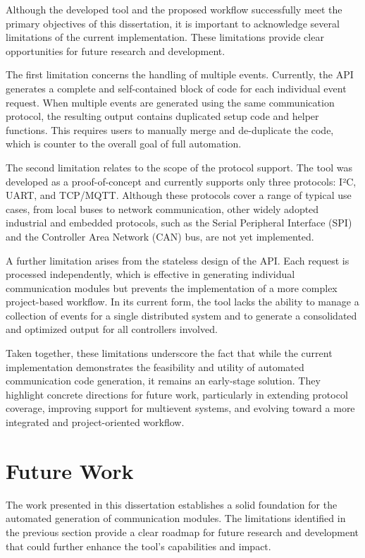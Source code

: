 Although the developed tool and the proposed workflow successfully meet the primary objectives of this dissertation, it is important to acknowledge several limitations of the current implementation. These limitations provide clear opportunities for future research and development. 

The first limitation concerns the handling of multiple events. Currently, the API generates a complete and self-contained block of code for each individual event request. When multiple events are generated using the same communication protocol, the resulting output contains duplicated setup code and helper functions. This requires users to manually merge and de-duplicate the code, which is counter to the overall goal of full automation.

The second limitation relates to the scope of the protocol support. The tool was developed as a proof-of-concept and currently supports only three protocols: I²C, UART, and TCP/MQTT. Although these protocols cover a range of typical use cases, from local buses to network communication, other widely adopted industrial and embedded protocols, such as the Serial Peripheral Interface (SPI) and the Controller Area Network (CAN) bus, are not yet implemented.

A further limitation arises from the stateless design of the API. Each request is processed independently, which is effective in generating individual communication modules but prevents the implementation of a more complex project-based workflow. In its current form, the tool lacks the ability to manage a collection of events for a single distributed system and to generate a consolidated and optimized output for all controllers involved.

Taken together, these limitations underscore the fact that while the current implementation demonstrates the feasibility and utility of automated communication code generation, it remains an early-stage solution. They highlight concrete directions for future work, particularly in extending protocol coverage, improving support for multievent systems, and evolving toward a more integrated and project-oriented workflow.



\section{Future Work}
\label{sec:future_work}

The work presented in this dissertation establishes a solid foundation for the automated generation of communication modules. The limitations identified in the previous section provide a clear roadmap for future research and development that could further enhance the tool's capabilities and impact. 

